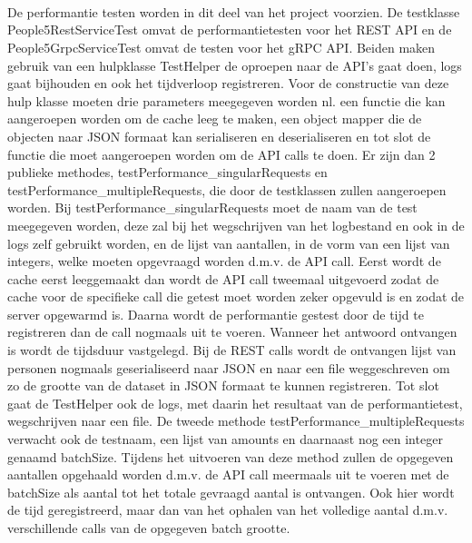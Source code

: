 
~\autocite{quarkusgRPCclient}\\
~\autocite{SmallRyeMutiny}\\
~\autocite{MultiSubscribing}\\

De performantie testen worden in dit deel van het project voorzien. De testklasse People5RestServiceTest omvat de performantietesten voor het REST API
en de People5GrpcServiceTest omvat de testen voor het gRPC API. Beiden maken gebruik van een hulpklasse TestHelper de oproepen naar de API's gaat doen,
logs gaat bijhouden en ook het tijdverloop registreren. Voor de constructie van deze hulp klasse moeten drie parameters meegegeven worden nl. een functie
die kan aangeroepen worden om de cache leeg te maken, een object mapper die de objecten naar JSON formaat kan serialiseren en deserialiseren en tot slot de
functie die moet aangeroepen worden om de API calls te doen. Er zijn dan 2 publieke methodes, testPerformance\_singularRequests en testPerformance\_multipleRequests,
die door de testklassen zullen aangeroepen worden. Bij testPerformance\_singularRequests moet de naam van de test meegegeven worden, deze zal bij het wegschrijven
van het logbestand en ook in de logs zelf gebruikt worden, en de lijst van aantallen, in de vorm van een lijst van integers, welke moeten opgevraagd worden
d.m.v. de API call. Eerst wordt de cache eerst leeggemaakt dan wordt de API call tweemaal uitgevoerd zodat de cache voor de specifieke call die getest moet worden
zeker opgevuld is en zodat de server opgewarmd is. Daarna wordt de performantie gestest door de tijd te registreren dan de call nogmaals uit te voeren.
Wanneer het antwoord ontvangen is wordt de tijdsduur vastgelegd. Bij de REST calls wordt de ontvangen lijst van personen nogmaals geserialiseerd naar JSON
en naar een file weggeschreven om zo de grootte van de dataset in JSON formaat te kunnen registreren.
Tot slot gaat de TestHelper ook de logs, met daarin het resultaat van de performantietest, wegschrijven naar een file.
De tweede methode testPerformance\_multipleRequests verwacht ook de testnaam, een lijst van amounts en daarnaast nog een integer genaamd batchSize.
Tijdens het uitvoeren van deze method zullen de opgegeven aantallen opgehaald worden d.m.v. de API call meermaals uit te voeren met de batchSize als aantal
tot het totale gevraagd aantal is ontvangen. Ook hier wordt de tijd geregistreerd, maar dan van het ophalen van het volledige aantal d.m.v.
verschillende calls van de opgegeven batch grootte.\\

